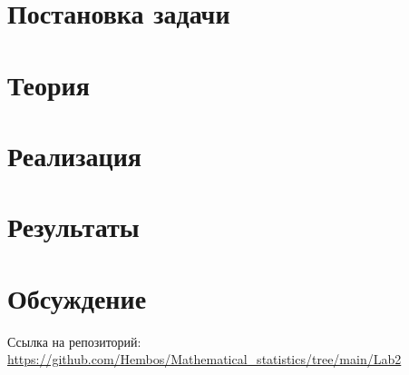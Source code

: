 \section{Постановка задачи}

\newpage

\section{Теория}

\newpage

\section{Реализация}


\section{Результаты}

\newpage

\section{Обсуждение}

\newpage



Ссылка на репозиторий: \url{https://github.com/Hembos/Mathematical_statistics/tree/main/Lab2}